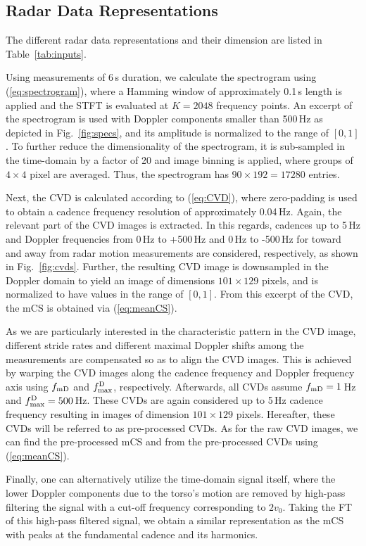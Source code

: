 \subsection{Radar Data Representations}\label{ssec:inputsignals}
The different radar data representations and their dimension are listed in Table~\ref{tab:inputs}.

Using measurements of 6\,s duration, we calculate the spectrogram using (\ref{eq:spectrogram}), where a Hamming window of approximately 0.1\,s length is applied and the STFT is evaluated at $K = 2048$ frequency points. An excerpt of the spectrogram is used with Doppler components smaller than 500\,Hz as depicted in Fig.~\ref{fig:specs}, and its amplitude is normalized to the range of $[0,1]$. To further reduce the dimensionality of the spectrogram, it is sub-sampled in the time-domain by a factor of 20 and image binning is applied, where groups of $4\times4$ pixel are averaged. Thus, the spectrogram has $90 \times 192 = 17280$ entries. 

Next, the CVD is calculated according to (\ref{eq:CVD}), where zero-padding is used to obtain a cadence frequency resolution of approximately 0.04\,Hz. Again, the relevant part of the CVD images is extracted. In this regards, cadences up to 5\,Hz and Doppler frequencies from 0\,Hz to +500\,Hz and 0\,Hz to \mbox{-500\,Hz} for toward and away from radar motion measurements are considered, respectively, as shown in Fig.~\ref{fig:cvds}. Further, the resulting CVD image is downsampled in the Doppler domain to yield an image of dimensions $101 \times 129$ pixels, and is normalized to have values in the range of $[0,1]$. From this excerpt of the CVD, the mCS is obtained via (\ref{eq:meanCS}). 

As we are particularly interested in the characteristic pattern in the CVD image, different stride rates and different maximal Doppler shifts among the measurements are compensated so as to align the CVD images. This is achieved by warping the CVD images along the cadence frequency and Doppler frequency axis using ${f_\text{mD}}$ and ${f^\mathrm{D}_\text{max}}$, respectively. Afterwards, all CVDs assume ${f_\text{mD}} = 1$\,Hz and ${f^\mathrm{D}_\text{max}} = 500$\,Hz. These CVDs are again considered up to 5\,Hz cadence frequency resulting in images of dimension $101 \times 129$ pixels. Hereafter, these CVDs will be referred to as pre-processed CVDs. As for the raw CVD images, we can find the pre-processed mCS and from the pre-processed CVDs using (\ref{eq:meanCS}).

Finally, one can alternatively utilize the time-domain signal itself, where the lower Doppler components due to the torso's motion are removed by high-pass filtering the signal with a cut-off frequency corresponding to $2v_0$. Taking the FT of this high-pass filtered signal, we obtain a similar representation as the mCS with peaks at the fundamental cadence and its harmonics.

